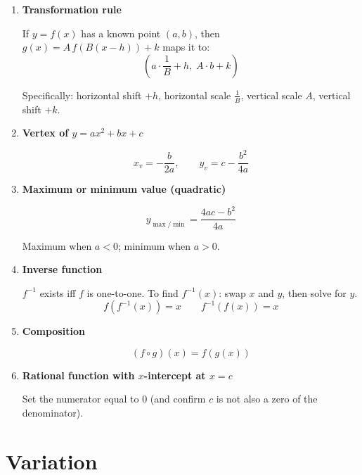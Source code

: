 \documentclass[10pt,letterpaper]{article}
\begin{document}
\begin{enumerate}

\item \textbf{Transformation rule}

If $y = f(x)$ has a known point $(a, b)$, then $g(x) = A\,f\!\left(B(x-h)\right)+k$ maps it to:
$$\left(a \cdot \frac{1}{B} + h,\; A \cdot b + k\right)$$

Specifically: horizontal shift $+h$, horizontal scale $\frac{1}{B}$, vertical scale $A$, vertical shift $+k$.

\item \textbf{Vertex of $y = ax^2+bx+c$}

$$x_v = -\frac{b}{2a}, \qquad y_v = c - \frac{b^2}{4a}$$

\item \textbf{Maximum or minimum value (quadratic)}

$$y_{\max/\min} = \frac{4ac - b^2}{4a}$$

Maximum when $a < 0$; minimum when $a > 0$.

\item \textbf{Inverse function}

$f^{-1}$ exists iff $f$ is one-to-one. To find $f^{-1}(x)$: swap $x$ and $y$, then solve for $y$.
$$f(f^{-1}(x)) = x \qquad f^{-1}(f(x)) = x$$

\item \textbf{Composition}

$$(f \circ g)(x) = f(g(x))$$

\item \textbf{Rational function with $x$-intercept at $x = c$}

Set the numerator equal to 0 (and confirm $c$ is not also a zero of the denominator).

\end{enumerate}

\section{Variation}
\end{document}
